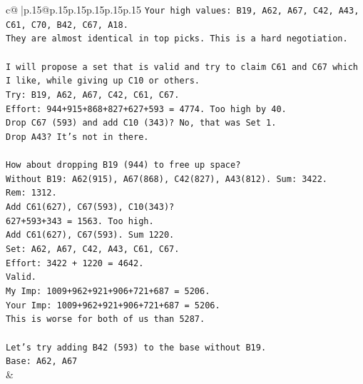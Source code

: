 \documentclass{article}
\begin{document}
{\begin{supertabular}{c@{$\;$}|p{.15\linewidth}@{}p{.15\linewidth}p{.15\linewidth}p{.15\linewidth}p{.15\linewidth}p{.15\linewidth}}
{{{\texttt{Your high values: B19, A62, A67, C42, A43, C61, C70, B42, C67, A18.} \\
\texttt{They are almost identical in top picks. This is a hard negotiation.} \\
\\ 
\texttt{I will propose a set that is valid and try to claim C61 and C67 which I like, while giving up C10 or others.} \\
\texttt{Try: B19, A62, A67, C42, C61, C67.} \\
\texttt{Effort: 944+915+868+827+627+593 = 4774. Too high by 40.} \\
\texttt{Drop C67 (593) and add C10 (343)? No, that was Set 1.} \\
\texttt{Drop A43? It's not in there.} \\
\\ 
\texttt{How about dropping B19 (944) to free up space?} \\
\texttt{Without B19: A62(915), A67(868), C42(827), A43(812). Sum: 3422.} \\
\texttt{Rem: 1312.} \\
\texttt{Add C61(627), C67(593), C10(343)?} \\
\texttt{627+593+343 = 1563. Too high.} \\
\texttt{Add C61(627), C67(593). Sum 1220.} \\
\texttt{Set: A62, A67, C42, A43, C61, C67.} \\
\texttt{Effort: 3422 + 1220 = 4642.} \\
\texttt{Valid.} \\
\texttt{My Imp: 1009+962+921+906+721+687 = 5206.} \\
\texttt{Your Imp: 1009+962+921+906+721+687 = 5206.} \\
\texttt{This is worse for both of us than 5287.} \\
\\ 
\texttt{Let's try adding B42 (593) to the base without B19.} \\
\texttt{Base: A62, A67} \\
            }
        }
    }
    & \\ \\


\end{supertabular}}
\end{document}
